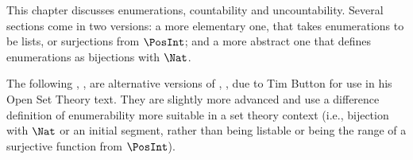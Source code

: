 \documentclass[../../../include/open-logic-chapter]{subfiles}
\begin{document}

\begin{editorial}
This chapter discusses enumerations, countability and uncountability.
Several sections come in two versions: a more elementary one, that
takes enumerations to be lists, or surjections from $\PosInt$; and a
more abstract one that defines enumerations as bijections with $\Nat$.
\end{editorial}











\begin{editorial}
The following ,
,  are
alternative versions of ,
,  due to Tim
Button for use in his Open Set Theory text. They are slightly more
advanced and use a difference definition of enumerability more
suitable in a set theory context (i.e., bijection with $\Nat$ or an
initial segment, rather than being listable or being the range of a
surjective function from $\PosInt$).
\end{editorial}


\OLEndChapterHook
\end{document}

